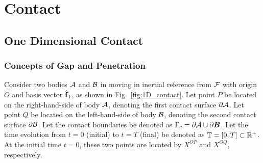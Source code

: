 \chapter{Contact}

\section{One Dimensional Contact}

\subsection{Concepts of Gap and Penetration}
Consider two bodies $\mathcal{A}$ and $\mathcal{B}$ in moving in inertial reference from 
$\mathcal{F}$ with origin
$O$ and basis vector $\hat{\mbox{\boldmath $\sf{f}$}}_1$, as shown in Fig.~\ref{fig:1D_contact}.
Let point $P$ be located on the right-hand-side of body $\mathcal{A}$, 
denoting the first contact surface
$\partial \mathcal{A}$.
Let point $Q$ be located on the left-hand-side of body $\mathcal{B}$, 
denoting the second contact surface
$\partial \mathcal{B}$.  Let the contact boundaries be denoted 
as $\Gamma_c = \partial \mathcal{A} \cup \partial \mbox{\boldmath $B$}$. 
Let the time evolution from $t=0$ (initial) to $t=T$ (final) 
be denoted as $\mathbb{T} = [0, T] \subset {\mathbb{R}^+}$.
At the initial time $t=0$, these two points are located 
by $X^{OP}$ and $X^{OQ}$, respectively.

